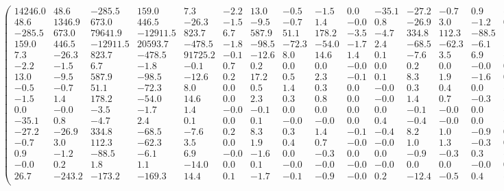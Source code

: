 \begin{equation*}
    \begin{pmatrix}
        14246.0 &48.6 &-285.5 &159.0 &7.3 &-2.2 &13.0 &-0.5 &-1.5 &0.0 &-35.1 &-27.2 &-0.7 &0.9 &-0.0 &26.7 \\
        48.6 &1346.9 &673.0 &446.5 &-26.3 &-1.5 &-9.5 &-0.7 &1.4 &-0.0 &0.8 &-26.9 &3.0 &-1.2 &0.2 &-243.2 \\
        -285.5 &673.0 &79641.9 &-12911.5 &823.7 &6.7 &587.9 &51.1 &178.2 &-3.5 &-4.7 &334.8 &112.3 &-88.5 &1.8 &-173.2 \\
        159.0 &446.5 &-12911.5 &20593.7 &-478.5 &-1.8 &-98.5 &-72.3 &-54.0 &-1.7 &2.4 &-68.5 &-62.3 &-6.1 &1.1 &-169.3 \\
        7.3 &-26.3 &823.7 &-478.5 &91725.2 &-0.1 &-12.6 &8.0 &14.6 &1.4 &0.1 &-7.6 &3.5 &6.9 &-14.0 &14.4 \\
        -2.2 &-1.5 &6.7 &-1.8 &-0.1 &0.7 &0.2 &0.0 &0.0 &-0.0 &0.0 &0.2 &0.0 &-0.0 &0.0 &0.1 \\
        13.0 &-9.5 &587.9 &-98.5 &-12.6 &0.2 &17.2 &0.5 &2.3 &-0.1 &0.1 &8.3 &1.9 &-1.6 &0.1 &-1.7 \\
        -0.5 &-0.7 &51.1 &-72.3 &8.0 &0.0 &0.5 &1.4 &0.3 &0.0 &-0.0 &0.3 &0.4 &0.0 &-0.0 &-0.1 \\
        -1.5 &1.4 &178.2 &-54.0 &14.6 &0.0 &2.3 &0.3 &0.8 &0.0 &-0.0 &1.4 &0.7 &-0.3 &-0.0 &-0.9 \\
        0.0 &-0.0 &-3.5 &-1.7 &1.4 &-0.0 &-0.1 &0.0 &0.0 &0.0 &0.0 &-0.1 &-0.0 &0.0 &-0.0 &-0.0 \\
        -35.1 &0.8 &-4.7 &2.4 &0.1 &0.0 &0.1 &-0.0 &-0.0 &0.0 &0.4 &-0.4 &-0.0 &0.0 &-0.0 &0.2 \\
        -27.2 &-26.9 &334.8 &-68.5 &-7.6 &0.2 &8.3 &0.3 &1.4 &-0.1 &-0.4 &8.2 &1.0 &-0.9 &0.0 &-12.4 \\
        -0.7 &3.0 &112.3 &-62.3 &3.5 &0.0 &1.9 &0.4 &0.7 &-0.0 &-0.0 &1.0 &1.3 &-0.3 &0.0 &-0.5 \\
        0.9 &-1.2 &-88.5 &-6.1 &6.9 &-0.0 &-1.6 &0.0 &-0.3 &0.0 &0.0 &-0.9 &-0.3 &0.3 &-0.0 &0.4 \\
        -0.0 &0.2 &1.8 &1.1 &-14.0 &0.0 &0.1 &-0.0 &-0.0 &-0.0 &-0.0 &0.0 &0.0 &-0.0 &0.0 &-0.2 \\
        26.7 &-243.2 &-173.2 &-169.3 &14.4 &0.1 &-1.7 &-0.1 &-0.9 &-0.0 &0.2 &-12.4 &-0.5 &0.4 &-0.2 &272.5 \\
    \end{pmatrix}
   \end{equation*}
   \normalsize
   \\\\
 \clearpage


